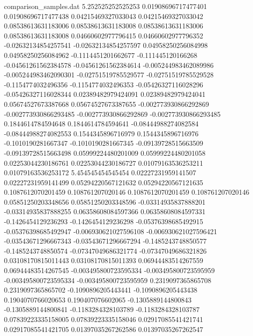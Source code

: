 \begin{filecontents}{comparison_samples.dat}
5.252525252525253   0.01908696717477401     0.01908696717477438     0.04215469327033043    0.04215469327033042    0.08538613631183006    0.08538613631183008    0.08538613631183006    0.08538613631183008    0.04660602977796415    0.04660602977796352    -0.02632134854257541    -0.02632134854257597    0.04958250256084998    0.04958250256084962    -0.1114451201662677     -0.111445120166268      -0.04561261562384578    -0.04561261562384614    -0.005244983462089986   -0.005244983462090301   -0.02751519785529577    -0.02751519785529528    -0.1154774032496356     -0.1154774032496353     -0.05426327116028296    -0.05426327116028344    0.02389482979424091    0.02389482979424041    0.05674527673387668    0.05674527673387655    -0.002773930866292869   -0.002773930866293485   -0.002773930866292869   -0.002773930866293485   0.1844614784594648     0.1844614784594641     -0.08444988274082584    -0.08444988274082553    0.1544345896716979     0.1544345896716976     -0.1010190281667347     -0.1010190281667345     -0.09139728515663509    -0.09139728515663498    0.05999224480201009    0.05999224480201058    0.02253044230186761    0.02253044230186727    0.01079163536253211     0.01079163536253172   
5.454545454545454   0.02227231959141507     0.02227231959141499     0.05294220567121632    0.05294220567121635    0.1087612070201459     0.108761207020146      0.1087612070201459     0.108761207020146      0.05851250203348656    0.05851250203348596    -0.03314935837888201    -0.03314935837888255    0.06358608084597366    0.06358608084597331    -0.1426454129236293     -0.1426454129236298     -0.05376398685492915    -0.05376398685492947    -0.006930621027596108   -0.006930621027596421   -0.03543671296667343    -0.03543671296667294    -0.1485243748850577     -0.1485243748850574     -0.07347049686321774    -0.07347049686321826    0.03108170815011443    0.03108170815011393    0.06944483514267559    0.06944483514267545    -0.003495800723595334   -0.003495800723595959   -0.003495800723595334   -0.003495800723595959   0.2319097365865708     0.2319097365865702     -0.1090896205443441     -0.1090896205443438     0.1904070766020653     0.190407076602065      -0.1305889144800843     -0.1305889144800841     -0.1183284328103789     -0.1183284328103787     0.07839223335158005    0.07839223335158046    0.02917085541421741    0.02917085541421705    0.01397035267262586     0.01397035267262547   

\end{filecontents}
